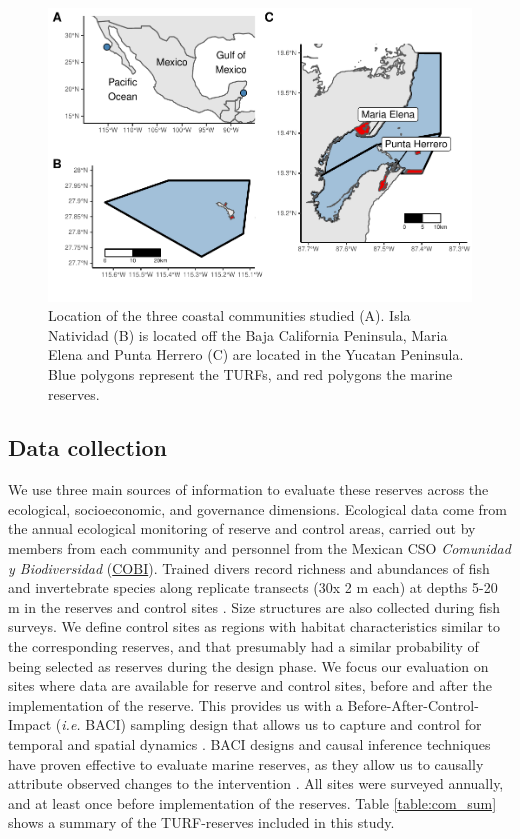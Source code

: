 \documentclass{frontiersSCNS}
\theoremstyle{definition}
\theoremstyle{definition}
\theoremstyle{definition}
\theoremstyle{remark}
\begin{document}
\clearpage

\begin{figure}
\centering
\includegraphics{Villasenor-Derbez_files/figure-latex/unnamed-chunk-1-1.pdf}
\caption{\label{fig:unnamed-chunk-1}\label{fig:map}Location of the three
coastal communities studied (A). Isla Natividad (B) is located off the
Baja California Peninsula, Maria Elena and Punta Herrero (C) are located
in the Yucatan Peninsula. Blue polygons represent the TURFs, and red
polygons the marine reserves.}
\end{figure}

\subsection{Data collection}\label{data-collection}

We use three main sources of information to evaluate these reserves
across the ecological, socioeconomic, and governance dimensions.
Ecological data come from the annual ecological monitoring of reserve
and control areas, carried out by members from each community and
personnel from the Mexican CSO \emph{Comunidad y Biodiversidad}
(\href{www.cobi.org.mx}{COBI}). Trained divers record richness and
abundances of fish and invertebrate species along replicate transects
(30x 2 m each) at depths 5-20 m in the reserves and control sites
\citep{fulton_2018}. Size structures are also collected during fish
surveys. We define control sites as regions with habitat characteristics
similar to the corresponding reserves, and that presumably had a similar
probability of being selected as reserves during the design phase. We
focus our evaluation on sites where data are available for reserve and
control sites, before and after the implementation of the reserve. This
provides us with a Before-After-Control-Impact (\emph{i.e.} BACI)
sampling design that allows us to capture and control for temporal and
spatial dynamics \citep{depalma_2018,ferraro_2006-oW}. BACI designs and
causal inference techniques have proven effective to evaluate marine
reserves, as they allow us to causally attribute observed changes to the
intervention \citep{moland_2013-VP,Villasenor-Derbez_2018}. All sites
were surveyed annually, and at least once before implementation of the
reserves. Table \ref{table:com_sum} shows a summary of the TURF-reserves
included in this study.
\end{document}
